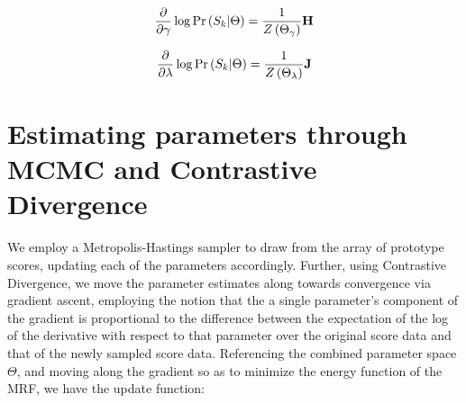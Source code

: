 \documentclass{article}
\begin{document}
\[\frac{\partial}{\partial\gamma}\log{\Pr\left(S_k|\Theta\right)} = \frac{1}{Z\left(\Theta_\gamma\right)}{\bf H}\]

\[\frac{\partial}{\partial\lambda}\log{\Pr\left(S_k|\Theta\right)} = \frac{1}{Z\left(\Theta_\lambda\right)}{\bf J}\]




%
%
%


\section{Estimating parameters through MCMC and Contrastive Divergence}
We employ a Metropolis-Hastings sampler to draw from the array of prototype scores, updating each of the parameters accordingly.  Further, using Contrastive Divergence, we move the parameter estimates along towards convergence via gradient ascent, employing the notion that the a single parameter's component of the gradient is proportional to the difference between the expectation of the log of the derivative with respect to that parameter over the original score data and that of the newly sampled score data.  Referencing the combined parameter space $\Theta$, and moving along the gradient so as to minimize the energy function of the MRF, we have the update function:
\end{document}
